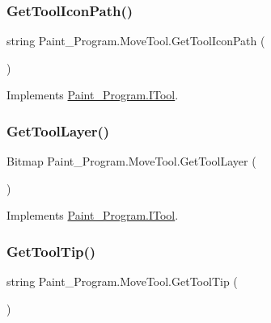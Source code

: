 \subsubsection{\texorpdfstring{Get\+Tool\+Icon\+Path()}{GetToolIconPath()}}
{\footnotesize\ttfamily string Paint\+\_\+\+Program.\+Move\+Tool.\+Get\+Tool\+Icon\+Path (\begin{DoxyParamCaption}{ }\end{DoxyParamCaption})\hspace{0.3cm}{\ttfamily [inline]}}



Implements \mbox{\hyperlink{interface_paint___program_1_1_i_tool_aa057d2f99c59d7bec0215dcad2da1b72}{Paint\+\_\+\+Program.\+I\+Tool}}.

\mbox{\label{class_paint___program_1_1_move_tool_a1d458ccea18d91c95d7da179fc3503e2}} 
\subsubsection{\texorpdfstring{Get\+Tool\+Layer()}{GetToolLayer()}}
{\footnotesize\ttfamily Bitmap Paint\+\_\+\+Program.\+Move\+Tool.\+Get\+Tool\+Layer (\begin{DoxyParamCaption}{ }\end{DoxyParamCaption})\hspace{0.3cm}{\ttfamily [inline]}}



Implements \mbox{\hyperlink{interface_paint___program_1_1_i_tool_a9b057905515f42a988c166a6a40318e0}{Paint\+\_\+\+Program.\+I\+Tool}}.

\mbox{\label{class_paint___program_1_1_move_tool_a909f48c0aa28f1f5932b42dfa076200b}} 
\subsubsection{\texorpdfstring{Get\+Tool\+Tip()}{GetToolTip()}}
{\footnotesize\ttfamily string Paint\+\_\+\+Program.\+Move\+Tool.\+Get\+Tool\+Tip (\begin{DoxyParamCaption}{ }\end{DoxyParamCaption})\hspace{0.3cm}{\ttfamily [inline]}}



